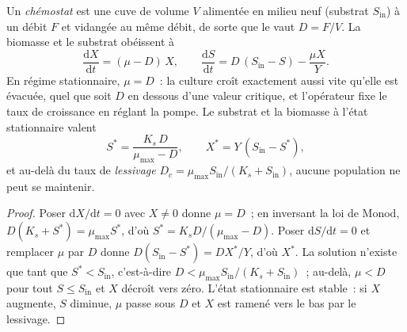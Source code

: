 \begin{theorem}[Le chémostat]\label{thm:b2:microbial-metabolism:chemostat}
Un \emph{chémostat} est une cuve de volume $V$ alimentée en milieu neuf
(substrat $S_{\text{in}}$) à un débit $F$ et vidangée au même débit, de
sorte que le \emph{} vaut $D = F/V$. La biomasse et le
substrat obéissent à
\[
\frac{\mathrm{d}X}{\mathrm{d}t} = (\mu - D)\,X, \qquad
\frac{\mathrm{d}S}{\mathrm{d}t} = D\,(S_{\text{in}} - S) - \frac{\mu X}{Y}.
\]
En régime stationnaire, $\mu = D$~: la culture croît exactement aussi
vite qu'elle est évacuée, quel que soit $D$ en dessous d'une valeur
critique, et l'opérateur fixe le taux de croissance en réglant la
pompe. Le substrat et la biomasse à l'état stationnaire valent
\[
S^* = \frac{K_s\,D}{\mu_{\max} - D}, \qquad X^* = Y\,(S_{\text{in}} - S^*),
\]
et au-delà du taux de \emph{lessivage} $D_c = \mu_{\max}
S_{\text{in}}/(K_s + S_{\text{in}})$, aucune population ne peut se
maintenir.
\end{theorem}
\begin{proof}
Poser $\mathrm{d}X/\mathrm{d}t = 0$ avec $X \neq 0$ donne $\mu = D$~;
en inversant la loi de Monod, $D(K_s + S^*) = \mu_{\max} S^*$, d'où $S^* =
K_s D/(\mu_{\max} - D)$. Poser $\mathrm{d}S/\mathrm{d}t = 0$ et
remplacer $\mu$ par $D$ donne $D(S_{\text{in}} - S^*) = DX^*/Y$, d'où
$X^*$. La solution n'existe que tant que $S^* < S_{\text{in}}$, c'est-à-dire
$D < \mu_{\max} S_{\text{in}}/(K_s + S_{\text{in}})$~; au-delà,
$\mu < D$ pour tout $S \le S_{\text{in}}$ et $X$ décroît vers zéro.
L'état stationnaire est stable~: si $X$ augmente, $S$ diminue, $\mu$
passe sous
$D$ et $X$ est ramené vers le bas par le lessivage.
\end{proof}

